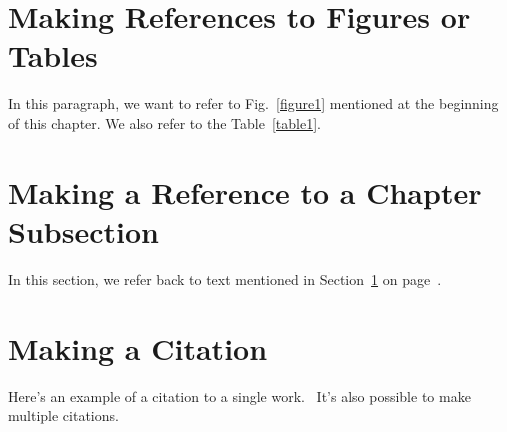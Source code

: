 \section{Making References to Figures or Tables}
\label{makereference1.1}

In this paragraph, we want to refer to Fig.~\ref{figure1}
mentioned at the beginning of this chapter.  We also refer to the
Table~\ref{table1}.

\section{Making a Reference to a Chapter Subsection}
\label{makereference1.2}

In this section, we refer back to text mentioned in
Section~\ref{makereference1.1} on page~\pageref{makereference1.1}.

\section{Making a Citation}
\label{makereference1.3}

Here's an example of a citation to a single
work.~\citet{CT:Weiner:1999} It's also possible to make multiple
citations.~\citet{CT:Phillips:1985, ARP:Loy:1974}
\citet{MiLibro}
